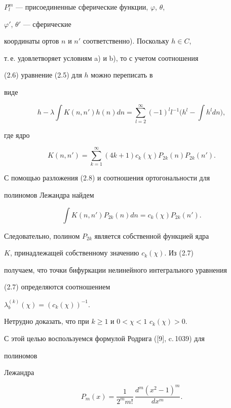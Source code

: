 $P^m_l$ --- присоединенные сферические функции, $\varphi$, $\theta$, 


$\varphi'$, $\theta'$ --- сферические 


координаты ортов $n$ и $n'$ соответственно). Поскольку $h\in C$, 


т.\,е. удовлетворяет условиям a) и b), то с учетом соотношения  


(2.6) уравнение (2.5) для $h$ можно переписать в 


виде 


\begin{equation} 


h-\lambda\int K(n,n')h(n)dn=\sum^\infty_{l=2} 


(-1)^l l^{-1}\Big(h^l-\int h^l dn\Big),\tag{2.7} 


\end{equation} 


где ядро 


\begin{equation} 


K(n,n')=\sum^\infty_{k=1}(4k+1)c_k(\chi) 


P_{2k}(n)P_{2k}(n').\tag{2.8} 


\end{equation} 


С помощью разложения (2.8) и соотношения ортогональности для 


полиномов Лежандра найдем 


$$ 


\int K(n,n')P_{2k}(n)dn=c_k(\chi)P_{2k}(n'). 


$$ 


Следовательно, полином $P_{2k}$ является собственной функцией ядра  


$K$, принадлежащей собственному значению $c_k(\chi)$. Из (2.7) 


получаем, что точки бифуркации нелинейного интегрального уравнения 


(2.7) определяются соотношением 


$\lambda^{(k)}_b(\chi)=(c_k(\chi))^{-1}$. 


 


Нетрудно доказать, что при $k\ge 1$ и $0<\chi<1$\; $c_k(\chi)>0$. 


С этой целью воспользуемся формулой Родрига ([9], c.\,1039) для 


полиномов 


Лежандра 


\begin{equation} 


P_m(x)=\frac{1}{2^m m!}\,\frac{d^m(x^2-1)^m}{dx^m}.\tag{2.9} 


\end{equation} 


